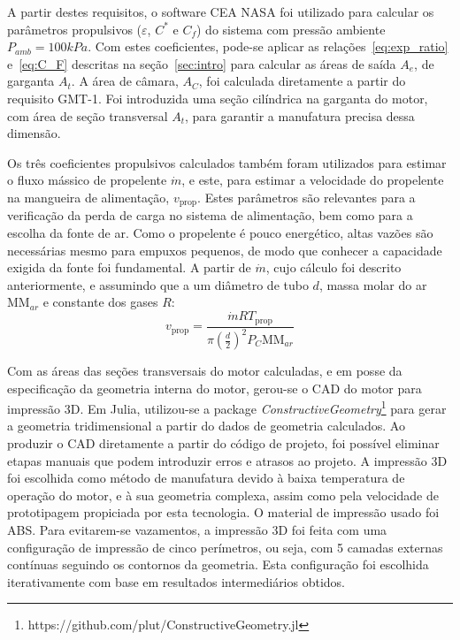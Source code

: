 A partir destes requisitos, o software CEA NASA foi utilizado para calcular os parâmetros propulsivos (\(\varepsilon \), \(C^\ast \) e \(C_f\)) do sistema com pressão ambiente \(P_{amb} = 100kPa\). Com estes coeficientes, pode-se aplicar as relações~\ref{eq:exp_ratio} e~\ref{eq:C_F} descritas na seção~\ref{sec:intro} para calcular as áreas de saída \(A_e\), de garganta \(A_t\). A área de câmara, \(A_C\), foi calculada diretamente a partir do requisito GMT-1. Foi introduzida uma seção cilíndrica na garganta do motor, com área de seção transversal \(A_t\), para garantir a manufatura precisa dessa dimensão.

Os três coeficientes propulsivos calculados também foram utilizados para estimar o fluxo mássico de propelente \(\dot{m}\), e este, para estimar a velocidade do propelente na mangueira de alimentação, \(v_{\text{prop}}\). Estes parâmetros são relevantes para a verificação da perda de carga no sistema de alimentação, bem como para a escolha da fonte de ar. Como o propelente é pouco energético, altas vazões são necessárias mesmo para empuxos pequenos, de modo que conhecer a capacidade exigida da fonte foi fundamental. A partir de \(\dot{m}\), cujo cálculo foi descrito anteriormente, e assumindo que a  um diâmetro de tubo \(d\), massa molar do ar \(\mathrm{MM}_{ar}\) e constante dos gases \(R\):
\begin{equation}
    v_{\text{prop}} = \frac{\dot{m} R T_{\text{prop}}}{\pi {\left(\frac{d}{2}\right)}^2 P_C \mathrm{MM}_{ar}}
\end{equation}

Com as áreas das seções transversais do motor calculadas, e em posse da especificação da geometria interna do motor, gerou-se o CAD do motor para impressão 3D. Em Julia, utilizou-se a package \textit{ConstructiveGeometry}\footnote[1]{https://github.com/plut/ConstructiveGeometry.jl} para gerar a geometria tridimensional a partir do dados de geometria calculados. Ao produzir o CAD diretamente a partir do código de projeto, foi possível eliminar etapas manuais que podem introduzir erros e atrasos ao projeto. A impressão 3D foi escolhida como método de manufatura devido à baixa temperatura de operação do motor, e à sua geometria complexa, assim como pela velocidade de prototipagem propiciada por esta tecnologia. O material de impressão usado foi ABS\@. Para evitarem-se vazamentos, a impressão 3D foi feita com uma configuração de impressão de cinco perímetros, ou seja, com 5 camadas externas contínuas seguindo os contornos da geometria. Esta configuração foi escolhida iterativamente com base em resultados intermediários obtidos.

